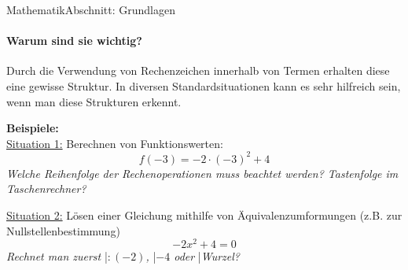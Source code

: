 \documentclass[11pt,twocolumn,oneside,openany,headings=optiontotoc,11pt,numbers=noenddot]{article}
\begin{document}
\begin{worksheet}{}{Mathematik}{Abschnitt: Grundlagen}
		\paragraph{Warum sind sie wichtig?}
		Durch die Verwendung von Rechenzeichen innerhalb von Termen erhalten diese eine gewisse Struktur. In diversen Standardsituationen kann es sehr hilfreich sein, wenn man diese Strukturen erkennt.
		\begin{framed}
			\noindent
			\textbf{Beispiele:}\\
			\underline{Situation 1:} Berechnen von Funktionswerten:
			\[f(-3) = -2\cdot (-3)^2 + 4\]
			\textit{Welche Reihenfolge der Rechenoperationen muss beachtet werden? Tastenfolge im Taschenrechner?}\\
			\par\noindent
			\underline{Situation 2:} Lösen einer Gleichung mithilfe von Äquivalenzumformungen (z.B. zur Nullstellenbestimmung)
			\[-2x^2 +4 = 0\]
			\textit{Rechnet man zuerst }|\textit{\(:(-2)\), }|\textit{\(-4\) oder }|\textit{\glqq{}Wurzel\grqq{}?}
		\end{framed}

\end{worksheet}
\end{document}

